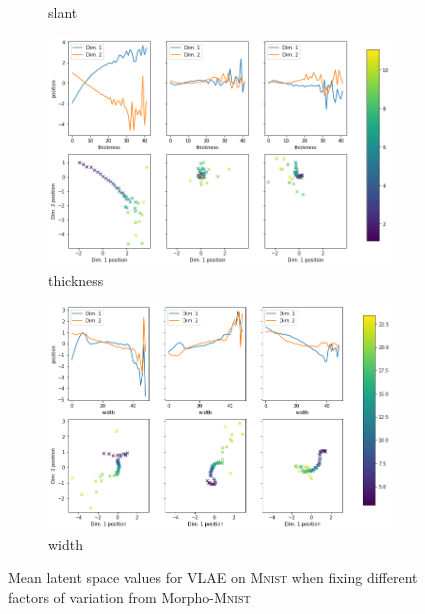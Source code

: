 \begin{figure}
\begin{subfigure}{.48\textwidth}
        \caption{slant}
        \label{subfig:vlae_mnist_morpho_latent_space_values_slant}
    \end{subfigure}
    \hfill
    \begin{subfigure}{.48\textwidth}
        \includegraphics[width=\textwidth]{images/latent_space_traversals/vlae_mnist_morpho_latent_space_values_thickness.png}
        \caption{thickness}
        \label{subfig:vlae_mnist_morpho_latent_space_values_thickness}
    \end{subfigure}
    \begin{subfigure}{.48\textwidth}
        \includegraphics[width=\textwidth]{images/latent_space_traversals/vlae_mnist_morpho_latent_space_values_width.png}
        \caption{width}
    \end{subfigure}
    \caption{Mean latent space values for \ac{VLAE} on \textsc{Mnist} when fixing different factors of variation from Morpho-\textsc{Mnist}}
    \label{fig:vlae_mnist_morpho_latent_space_values}
\end{figure}


